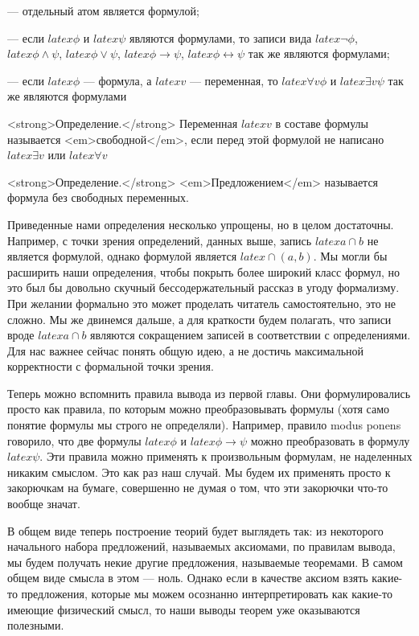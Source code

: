 — отдельный атом является формулой;

— если $latex \phi$ и $latex \psi$ являются формулами, то записи вида $latex \neg \phi$, $latex \phi \wedge \psi$, $latex \phi \vee \psi$, $latex \phi \rightarrow \psi$, $latex \phi \leftrightarrow \psi$ так же являются формулами;

— если $latex \phi$ — формула, а $latex v$ — переменная, то $latex \forall v \phi$ и $latex \exists v \psi$ так же являются формулами

<strong>Определение.</strong> Переменная $latex v$ в составе формулы называется <em>свободной</em>, если перед этой формулой не написано $latex \exists v$ или $latex \forall v$

<strong>Определение.</strong> <em>Предложением</em> называется формула без свободных переменных.

Приведенные нами определения несколько упрощены, но в целом достаточны. Например, с точки зрения определений, данных выше, запись $latex a\cap b$ не является формулой, однако формулой является $latex \cap(a, b)$. Мы могли бы расширить наши определения, чтобы покрыть более широкий класс формул, но это был бы довольно скучный бессодержательный рассказ в угоду формализму. При желании формально это может проделать читатель самостоятельно, это не сложно. Мы же двинемся дальше, а для краткости будем полагать, что записи вроде $latex a\cap b$ являются сокращением записей в соответствии с определениями. Для нас важнее сейчас понять общую идею, а не достичь максимальной корректности с формальной точки зрения.

Теперь можно вспомнить правила вывода из первой главы. Они формулировались просто как правила, по которым можно преобразовывать формулы (хотя само понятие формулы мы строго не определяли). Например, правило modus ponens говорило, что две формулы $latex \phi$ и $latex \phi\rightarrow\psi$ можно преобразовать в формулу $latex \psi$. Эти правила можно применять к произвольным формулам, не наделенных никаким смыслом. Это как раз наш случай. Мы будем их применять просто к закорючкам на бумаге, совершенно не думая о том, что эти закорючки что-то вообще значат.

В общем виде теперь построение теорий будет выглядеть так: из некоторого начального набора предложений, называемых аксиомами, по правилам вывода, мы будем получать некие другие предложения, называемые теоремами. В самом общем виде смысла в этом — ноль. Однако если в качестве аксиом взять какие-то предложения, которые мы можем осознанно интерпретировать как какие-то имеющие физический смысл, то наши выводы теорем уже оказываются полезными.

